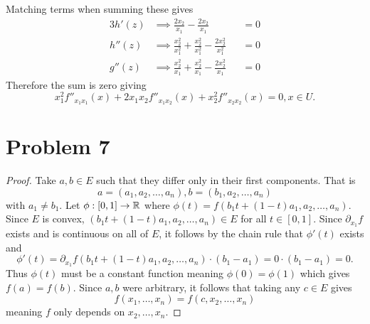 \documentclass{eeleyes}
\begin{document}
Matching terms when summing these gives
\begin{alignat*}{3}
    h'(z) &\implies \frac{2x_2}{x_1} - \frac{2x_2}{x_1} &&= 0
    \\
    h''(z) &\implies \frac{x_2^2}{x_1^2} + \frac{x_2^2}{x_1^2} - \frac{2x_2^2}{x_1^2} &&= 0
    \\
    g''(z) &\implies \frac{x_2^2}{x_1} + \frac{x_2^2}{x_1} - \frac{2x_2^2}{x_1} &&= 0
\end{alignat*}
Therefore the sum is zero giving
\[
    x_1^2 f''_{x_1 x_1}(x) + 2x_1 x_2 f''_{x_1 x_2}(x) + x_2^2 f''_{x_2 x_2}(x) = 0, x \in U
.\]

\section*{Problem 7}
\begin{proof}
    Take $a, b \in E$ such that they differ only in their first components. That is
    \[
        a = (a_1, a_2, \ldots, a_n), b = (b_1, a_2, \ldots, a_n)
    \]
    with $a_1 \neq b_1$. Let $\phi : [0,1] \to \mathbb{R}$ where $\phi(t) = f(b_1 t + (1-t)a_1, a_2, \ldots, a_n)$. Since $E$ is convex, $(b_1 t + (1-t)a_1, a_2, \ldots, a_n) \in E$ for all $t \in [0,1]$. Since $\partial_{x_1} f$ exists and is continuous on all of $E$, it follows by the chain rule that $\phi'(t)$ exists and
    \[
        \phi'(t) = \partial_{x_1} f(b_1 t + (1-t)a_1, a_2, \ldots, a_n) \cdot (b_1 - a_1) = 0 \cdot (b_1 - a_1) = 0
    .\]
    Thus $\phi(t)$ must be a constant function meaning $\phi(0) = \phi(1)$ which gives $f(a) = f(b)$. Since $a,b$ were arbitrary, it follows that taking any $c \in E$ gives
    \[
        f(x_1, \ldots, x_n) = f(c, x_2, \ldots, x_n)
    \]
    meaning $f$ only depends on $x_2, \ldots, x_n$.
\end{proof}
\end{document}
